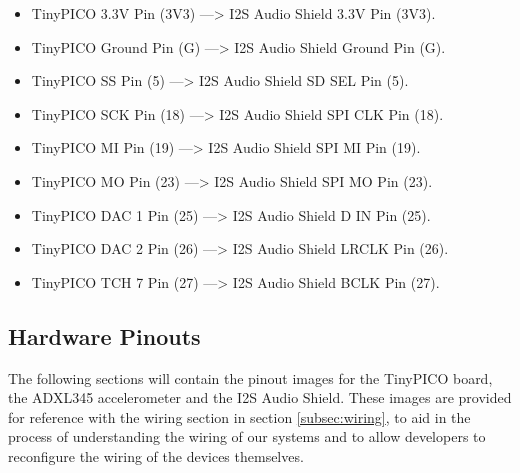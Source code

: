 				\begin{itemize}
					\item TinyPICO 3.3V Pin (3V3) \hspace{2.1em} ---> \hspace{2em} I2S Audio Shield 3.3V Pin (3V3).
					\item TinyPICO Ground Pin (G) \hspace{2em} ---> \hspace{2em} I2S Audio Shield Ground Pin (G).
					\item TinyPICO SS Pin (5) \hspace{4.15em} ---> \hspace{2em} I2S Audio Shield SD SEL Pin (5).
					\item TinyPICO SCK Pin (18) \hspace{2.8em} ---> \hspace{2em} I2S Audio Shield SPI CLK Pin (18).
					\item TinyPICO MI Pin (19) \hspace{3.55em} ---> \hspace{2em} I2S Audio Shield SPI MI Pin (19).
					\item TinyPICO MO Pin (23) \hspace{3.15em} ---> \hspace{2em} I2S Audio Shield SPI MO Pin (23).
					\item TinyPICO DAC 1 Pin (25) \hspace{2em} ---> \hspace{2em} I2S Audio Shield D IN Pin (25).
					\item TinyPICO DAC 2 Pin (26) \hspace{2em} ---> \hspace{2em} I2S Audio Shield LRCLK Pin (26).
					\item TinyPICO TCH 7 Pin (27) \hspace{2em} ---> \hspace{2em} I2S Audio Shield BCLK Pin (27).
				\end{itemize}

		\newpage
		\subsection{Hardware Pinouts}
		\label{subsec:hardware_pinouts}

			The following sections will contain the pinout images for the TinyPICO board, the ADXL345 accelerometer and the I2S Audio Shield. These images are provided for reference with the wiring section in section \ref{subsec:wiring}, to aid in the process of understanding the wiring of our systems and to allow developers to reconfigure the wiring of the devices themselves.

